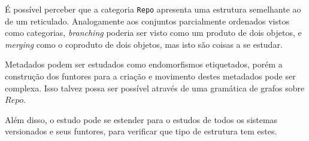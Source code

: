 \documentclass[a4paper]{article}
\begin{document}
É possível perceber que a categoria {\tt Repo} apresenta uma estrutura semelhante ao de um reticulado. Analogamente aos conjuntos parcialmente ordenados vistos como categorias, {\it branching} poderia ser visto como um produto de dois objetos, e {\it merging} como o coproduto de dois objetos, mas isto são coisas a se estudar.

Metadados podem ser estudados como endomorfismos etiquetados, porém a construção dos funtores para a criação e movimento destes metadados pode ser complexa. Isso talvez possa ser possível através de uma gramática de grafos sobre $Repo$.

Além disso, o estudo pode se estender para o estudos de todos os sistemas versionados e seus funtores, para verificar que tipo de estrutura tem estes.
\end{document}
